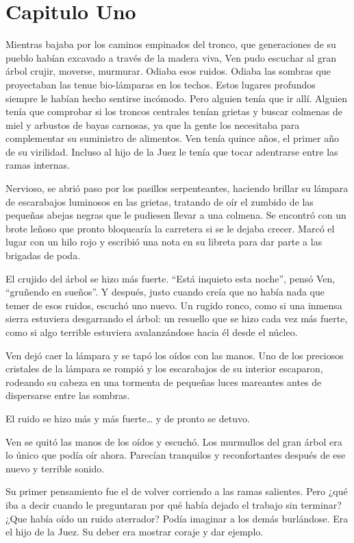 \chapter*{Capitulo Uno}

Mientras bajaba por los caminos empinados del tronco, que generaciones
de su pueblo habían excavado a través de la madera viva, Ven pudo
escuchar al gran árbol crujir, moverse, murmurar. Odiaba esos ruidos.
Odiaba las sombras que proyectaban las tenue bio-lámparas en los techos.
Estos lugares profundos siempre le habían hecho sentirse incómodo. Pero
alguien tenía que ir allí. Alguien tenía que comprobar si los troncos
centrales tenían grietas y buscar colmenas de miel y arbustos de bayas
carnosas, ya que la gente los necesitaba para complementar su suministro
de alimentos. Ven tenía quince años, el primer año de su virilidad.
Incluso al hijo de la Juez le tenía que tocar adentrarse entre las
ramas internas.

Nervioso, se abrió paso por los pasillos serpenteantes, haciendo brillar
su lámpara de escarabajos luminosos en las grietas, tratando de oír el
zumbido de las pequeñas abejas negras que le pudiesen llevar a una
colmena. Se encontró con un brote leñoso que pronto bloquearía la
carretera si se le dejaba crecer. Marcó el lugar con un hilo rojo y
escribió una nota en su libreta para dar parte a las brigadas de poda.

El crujido del árbol se hizo más fuerte. ``Está inquieto esta noche'',
pensó Ven, ``gruñendo en sueños''. Y después, justo cuando creía que no
había nada que temer de esos ruidos, escuchó uno nuevo. Un rugido ronco,
como si una inmensa sierra estuviera desgarrando el árbol: un resuello
que se hizo cada vez más fuerte, como si algo terrible estuviera
avalanzándose hacia él desde el núcleo.

Ven dejó caer la lámpara y se tapó los oídos con las manos. Uno de los
preciosos cristales de la lámpara se rompió y los escarabajos de su
interior escaparon, rodeando su cabeza en una tormenta de pequeñas luces
mareantes antes de dispersarse entre las sombras.

El ruido se hizo más y más fuerte\ldots{} y de pronto se detuvo.

Ven se quitó las manos de los oídos y escuchó. Los murmullos del gran
árbol era lo único que podía oír ahora. Parecían tranquilos y
reconfortantes después de ese nuevo y terrible sonido.

Su primer pensamiento fue el de volver corriendo a las ramas salientes.
Pero ¿qué iba a decir cuando le preguntaran por qué había dejado el
trabajo sin terminar? ¿Que había oído un ruido aterrador? Podía imaginar
a los demás burlándose. Era el hijo de la Juez. Su deber era mostrar
coraje y dar ejemplo.

